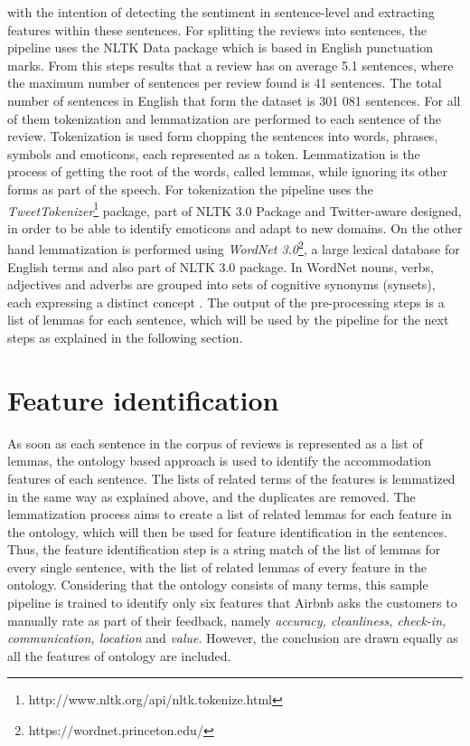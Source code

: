 with the intention of detecting the sentiment in sentence-level and extracting features within these sentences. For splitting the reviews into sentences, the pipeline uses the NLTK Data package which is based in English punctuation marks.  From this steps results that a review has on average 5.1 sentences, where the maximum number of sentences per review found is 41 sentences. The total number of sentences in English that form the dataset is 301 081 sentences. For all of them tokenization and lemmatization are performed to each sentence of the review. Tokenization is used form chopping the sentences into words, phrases, symbols and emoticons, each represented as a token. Lemmatization is the process of getting the root of the words, called lemmas, while ignoring its other forms as part of the speech. For tokenization the pipeline uses the \textit{TweetTokenizer}\footnote{http://www.nltk.org/api/nltk.tokenize.html} package, part of NLTK 3.0 Package and Twitter-aware designed, in order to be able to identify emoticons and adapt to new domains. On the other hand lemmatization is performed using \textit{WordNet 3.0}\footnote{https://wordnet.princeton.edu/}, a large lexical database for English terms and also part of NLTK 3.0 package. In WordNet nouns, verbs, adjectives and adverbs are grouped into sets of cognitive synonyms (synsets), each expressing a distinct concept \cite{miller1995wordnet}. The output of the pre-processing steps is a list of lemmas for each sentence, which will be used by the pipeline for the next steps as explained in the following section.  
%
\section{Feature identification}
As soon as each sentence in the corpus of reviews is represented as a list of lemmas, the ontology based approach is used to identify the accommodation features of each sentence.  The lists of related terms of the features is lemmatized in the same way as explained above, and the duplicates are removed. The lemmatization process aims to create a list of related lemmas for each feature in the ontology, which will then be used for feature identification in the sentences.
Thus, the feature identification step is a string match of the list of lemmas for every single sentence, with the list of related lemmas of every feature in the ontology. Considering that the ontology consists of many terms, this sample pipeline is trained to identify only six features that Airbnb asks the customers to manually rate as part of their feedback, namely \textit{accuracy, cleanliness, check-in, communication, location} and \textit{value}. However, the conclusion are drawn equally as all the features of ontology are included. 

